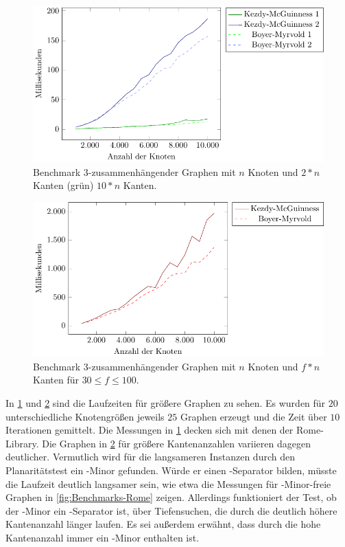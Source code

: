 \begin{figure}[H]
  \centering
  \includegraphics[width=\textwidth,height=\textheight,keepaspectratio]{plots/Benchmarks_Triconnected.pdf}
  \caption{Benchmark $3$-zusammenhängender Graphen mit $n$ Knoten und $2*n$ Kanten (grün) \bzw $10*n$ Kanten.}
  \label{fig:Benchmarks-Triconnected}
\end{figure}

\begin{figure}[H]
  \centering
  \includegraphics[width=\textwidth,height=\textheight,keepaspectratio]{plots/Benchmarks_TriconnectedVeryDense.pdf}
  \caption{Benchmark $3$-zusammenhängender Graphen mit $n$ Knoten und $f * n$ Kanten für $30 \leq f \leq 100$.}
  \label{fig:Benchmarks-Triconnected-Very-Dense}
\end{figure}

In \Abb \ref{fig:Benchmarks-Triconnected} und \Abb \ref{fig:Benchmarks-Triconnected-Very-Dense} sind die Laufzeiten für größere Graphen zu sehen.
Es wurden für $20$ unterschiedliche Knotengrößen jeweils $25$ Graphen erzeugt und die Zeit über $10$ Iterationen gemittelt.
Die Messungen in \Abb \ref{fig:Benchmarks-Triconnected} decken sich mit denen der Rome-Library.
Die Graphen in \Abb \ref{fig:Benchmarks-Triconnected-Very-Dense} für größere Kantenanzahlen variieren dagegen deutlicher.
Vermutlich wird für die langsameren Instanzen durch den Planaritätstest ein \kdd-Minor gefunden.
Würde er einen \dd-Separator bilden, müsste die Laufzeit deutlich langsamer sein, wie etwa die Messungen für \kf-Minor-freie Graphen in \Abb \ref{fig:Benchmarks-Rome} zeigen.
Allerdings funktioniert der Test, ob der \kdd-Minor ein \dd-Separator ist, über Tiefensuchen, die durch die deutlich höhere Kantenanzahl länger laufen.
Es sei außerdem erwähnt, dass durch die hohe Kantenanzahl immer ein \kf-Minor enthalten ist.

